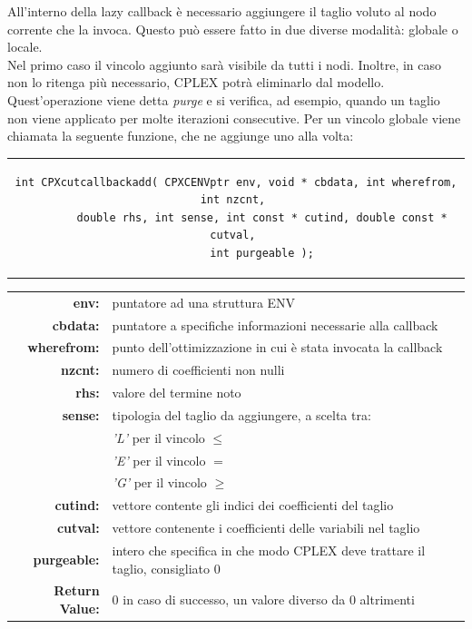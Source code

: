 All'interno della lazy callback è necessario aggiungere il taglio voluto al nodo corrente che la invoca. Questo può essere fatto in due diverse modalità: globale o locale.\\
Nel primo caso il vincolo aggiunto sarà visibile da tutti i nodi. Inoltre, in caso non lo ritenga più necessario, CPLEX potrà eliminarlo dal modello. Quest'operazione viene detta \textit{purge} e si verifica, ad esempio, quando un taglio non viene applicato per molte iterazioni consecutive. Per un vincolo globale viene chiamata la seguente funzione, che ne aggiunge uno alla volta:
\begin{center}
\begin{tabular}{c}
\begin{lstlisting}[linewidth=400pt, basicstyle=\footnotesize\sffamily,]  
int CPXcutcallbackadd( CPXCENVptr env, void * cbdata, int wherefrom, int nzcnt, 
		double rhs, int sense, int const * cutind, double const * cutval, 
		int purgeable );
\end{lstlisting}
\end{tabular}
\end{center}
\begin{table}[H]
\centering
\begin{tabular}{rl}
\textbf{env:} & {puntatore ad una struttura ENV}\\
\textbf{cbdata:} & {puntatore a specifiche informazioni necessarie alla callback}\\
\textbf{wherefrom:} & {punto dell'ottimizzazione in cui è stata invocata la callback} \\ 
\textbf{nzcnt:} & {numero di coefficienti non nulli} \\
\textbf{rhs:} & {valore del termine noto} \\
\textbf{sense:} & {tipologia del taglio da aggiungere, a scelta tra:} \\
&{\textit{'L'} per il vincolo $\leq$}\\
&{\textit{'E'} per il vincolo $=$}\\
&{\textit{'G'} per il vincolo $\geq$}\\
\textbf{cutind:} & {vettore contente gli indici dei coefficienti del taglio} \\
\textbf{cutval:} & {vettore contenente i coefficienti delle variabili nel taglio} \\
\textbf{purgeable:} & {intero che specifica in che modo CPLEX deve trattare il taglio, consigliato 0} \\
\textbf{Return Value:} & {0 in caso di successo, un valore diverso da 0 altrimenti}\\  
\end{tabular}
\end{table}
